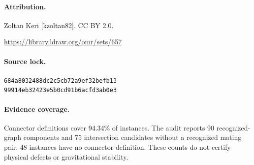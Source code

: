 \paragraph{Attribution.}Zoltan Keri [kzoltan82]. CC BY 2.0.\par\noindent\url{https://library.ldraw.org/omr/sets/657}
\paragraph{Source lock.}\small\texttt{684a8032488dc2c5cb72a9ef32befb13}\\\texttt{99914eb32423e5b0cd91b6acfd3ab0e3}\normalsize
\paragraph{Evidence coverage.}Connector definitions cover 94.34\% of instances. The audit reports 90 recognized-graph components and 75 intersection candidates without a recognized mating pair. 48 instances have no connector definition. These counts do not certify physical defects or gravitational stability.
